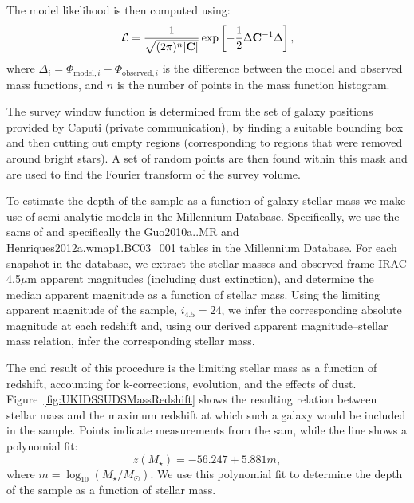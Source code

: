 The model likelihood is then computed using:
\begin{equation}
 \mathcal{L} = {1 \over \sqrt{(2 \pi)^n |\mathbf{C}|}} \exp\left[ -{1\over 2} \Delta \mathbf{C}^{-1} \Delta \right],
\end{equation}
where $\Delta_i = \Phi_{\mathrm{model}, i} - \Phi_{\mathrm{observed}, i}$ is the difference between the model and observed mass functions, and $n$ is the number of points in the mass function histogram.

The survey window function is determined from the set of galaxy positions provided by Caputi (private communication), by finding a suitable bounding box and then cutting out empty regions (corresponding to regions that were removed around bright stars). A set of random points are then found within this mask and are used to find the Fourier transform of the survey volume. 

To estimate the depth of the \cite{caputi_stellar_2011} sample as a function of galaxy stellar mass we make use of semi-analytic models in the Millennium Database. Specifically, we use the \glspl{sam} of \cite{guo_dwarf_2011} and \cite{henriques_confronting_2012} specifically the {\normalfont \ttfamily Guo2010a..MR} and {\normalfont \ttfamily Henriques2012a.wmap1.BC03\_001} tables in the Millennium Database. For each snapshot in the database, we extract the stellar masses and observed-frame IRAC 4.5$\mu$m apparent magnitudes (including dust extinction), and determine the median apparent magnitude as a function of stellar mass. Using the limiting apparent magnitude of the \cite{caputi_stellar_2011} sample, $i_{4.5}=24$, we infer the corresponding absolute magnitude at each redshift and, using our derived apparent magnitude--stellar mass relation, infer the corresponding stellar mass.

The end result of this procedure is the limiting stellar mass as a function of redshift, accounting for k-corrections, evolution, and the effects of dust. Figure~\ref{fig:UKIDSSUDSMassRedshift} shows the resulting relation between stellar mass and the maximum redshift at which such a galaxy would be included in the sample. Points indicate measurements from the \gls{sam}, while the line shows a polynomial fit:
\begin{equation}
 z(M_\star) = -56.247 + 5.881 m,
 \label{eq:UKIDSSUDSDepthPolynomial}
\end{equation}
where $m= \log_{10}(M_\star/M_\odot)$. We use this polynomial fit to determine the depth of the sample as a function of stellar mass.

